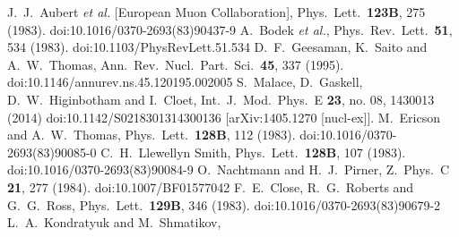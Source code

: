 \documentclass{ws-ijmpe}
\begin{document}
%
\begin{thebibliography}{0}
%
  J.~J.~Aubert {\it et al.} [European Muon Collaboration],
  Phys.\ Lett.\  {\bf 123B}, 275 (1983).
  doi:10.1016/0370-2693(83)90437-9
%
  A.~Bodek {\it et al.},
  Phys.\ Rev.\ Lett.\  {\bf 51}, 534 (1983).
  doi:10.1103/PhysRevLett.51.534
%
  D.~F.~Geesaman, K.~Saito and A.~W.~Thomas,
  Ann.\ Rev.\ Nucl.\ Part.\ Sci.\  {\bf 45}, 337 (1995).
  doi:10.1146/annurev.ns.45.120195.002005
%
  S.~Malace, D.~Gaskell, D.~W.~Higinbotham and I.~Cloet,
  Int.\ J.\ Mod.\ Phys.\ E {\bf 23}, no. 08, 1430013 (2014)
  doi:10.1142/S0218301314300136
  [arXiv:1405.1270 [nucl-ex]].
%
  M.~Ericson and A.~W.~Thomas,
  Phys.\ Lett.\  {\bf 128B}, 112 (1983).
  doi:10.1016/0370-2693(83)90085-0
%
  C.~H.~Llewellyn Smith,
  Phys.\ Lett.\  {\bf 128B}, 107 (1983).
  doi:10.1016/0370-2693(83)90084-9
%
  O.~Nachtmann and H.~J.~Pirner,
  Z.\ Phys.\ C {\bf 21}, 277 (1984).
  doi:10.1007/BF01577042
%
  F.~E.~Close, R.~G.~Roberts and G.~G.~Ross,
  Phys.\ Lett.\  {\bf 129B}, 346 (1983).
  doi:10.1016/0370-2693(83)90679-2
%
  L.~A.~Kondratyuk and M.~Shmatikov,

\end{thebibliography}
\end{document}

